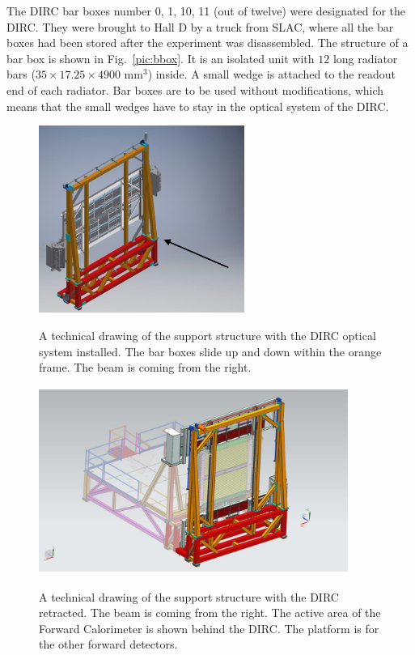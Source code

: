 The \babar DIRC bar boxes number 0, 1, 10, 11 (out of twelve) were designated for the \gluex DIRC. They were brought to Hall D by a truck from SLAC, where all the bar boxes had been stored after the \babar experiment was disassembled. The structure of a bar box is shown in Fig.~\ref{pic:bbox}. It is an isolated unit with $12$ long radiator bars ($35 \times 17.25 \times 4900 $ mm$^3$) inside. A small wedge is attached to the readout end of each radiator. Bar boxes are to be used without modifications, which means that the small wedges have to stay in the optical system of the \gluex DIRC.

\begin{figure}[h]
\centering
\includegraphics[width=0.6\textwidth]{pics/support.png} 
\caption{\label{pic:support}} A technical drawing of the support structure with the DIRC optical system installed. The bar boxes slide up and down within the orange frame. The beam is coming from the right.
\end{figure}

\begin{figure}[!h]
\centering
\includegraphics[width=0.9\textwidth]{pics/Full_Assy_Iso-retracted.pdf}
\caption{\label{pic:retracted}} A technical drawing of the support structure with the DIRC retracted. The beam is coming from the right. The active area of the Forward Calorimeter is shown behind the DIRC. The platform is for the other forward \gluex detectors.
\end{figure}

